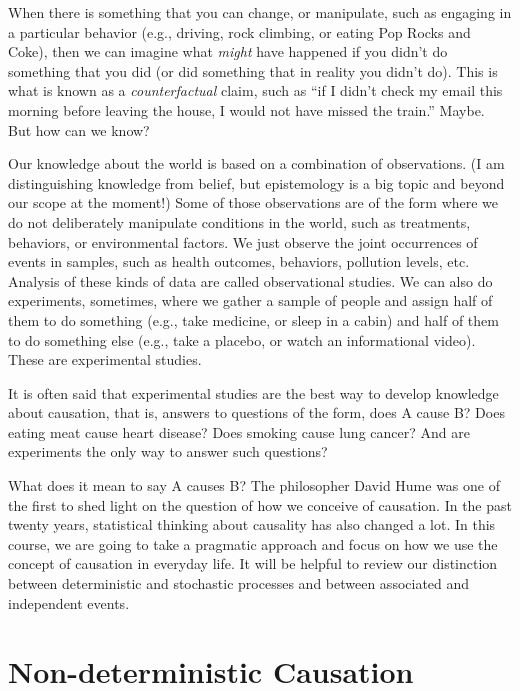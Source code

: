 \documentclass[openany]{book}
\begin{document}
When there is something that you can change, or manipulate, such as engaging in a particular behavior (e.g., driving, rock climbing, or eating Pop Rocks and Coke), then we can imagine what \emph{might} have happened if you didn't do something that you did (or did something that in reality you didn't do). This is what is known as a \emph{counterfactual} claim, such as ``if I didn't check my email this morning before leaving the house, I would not have missed the train.'' Maybe. But how can we know?

Our knowledge about the world is based on a combination of observations. (I am distinguishing knowledge from belief, but epistemology is a big topic and beyond our scope at the moment!) Some of those observations are of the form where we do not deliberately manipulate conditions in the world, such as treatments, behaviors, or environmental factors. We just observe the joint occurrences of events in samples, such as health outcomes, behaviors, pollution levels, etc. Analysis of these kinds of data are called observational studies. We can also do experiments, sometimes, where we gather a sample of people and assign half of them to do something (e.g., take medicine, or sleep in a cabin) and half of them to do something else (e.g., take a placebo, or watch an informational video). These are experimental studies.

It is often said that experimental studies are the best way to develop knowledge about causation, that is, answers to questions of the form, does A cause B? Does eating meat cause heart disease? Does smoking cause lung cancer? And are experiments the only way to answer such questions?

What does it mean to say A causes B? The philosopher David Hume was one of the first to shed light on the question of how we conceive of causation. In the past twenty years, statistical thinking about causality has also changed a lot. In this course, we are going to take a pragmatic approach and focus on how we use the concept of causation in everyday life. It will be helpful to review our distinction between deterministic and stochastic processes and between associated and independent events.

\hypertarget{non-deterministic-causation}{%
\section*{Non-deterministic Causation}\label{non-deterministic-causation}}
\end{document}
